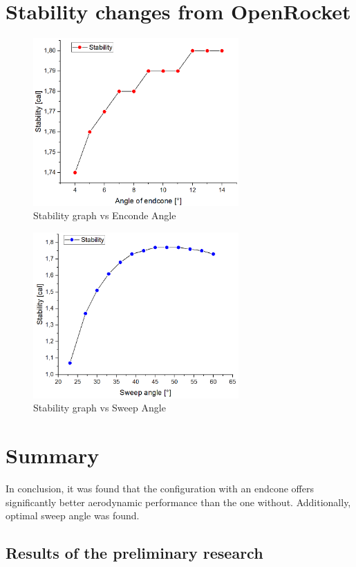 \documentclass{article}
\begin{document}
\section{Stability changes from OpenRocket}
\begin{figure}[H]
    \centering
    \includegraphics[width=0.7\textwidth]{../data/OR/EndconeStability.png}
    \caption{Stability graph vs Enconde Angle}
\end{figure}
\begin{figure}[H]
    \centering
    \includegraphics[width=0.7\textwidth]{../data/OR/FinStability.png}
    \caption{Stability graph vs Sweep Angle}
\end{figure}
\section{Summary}
In conclusion, it was found that the configuration with an endcone offers significantly better 
aerodynamic performance than the one without. Additionally, optimal sweep angle was found.
\subsection{Results of the preliminary research}
\end{document}
